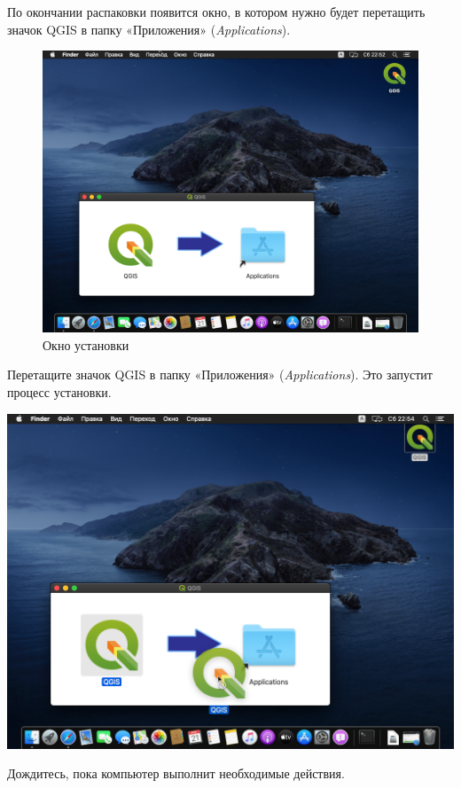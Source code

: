 \documentclass[
  12pt,
]{book}
\begin{document}
По окончании распаковки появится окно, в котором нужно будет перетащить значок QGIS в папку «Приложения» (\emph{Applications}).

\begin{figure}
\centering
\includegraphics{images/installation_instruction_mac/mac04.png}
\caption{Окно установки}
\end{figure}

Перетащите значок QGIS в папку «Приложения» (\emph{Applications}). Это запустит процесс установки.

\includegraphics{images/installation_instruction_mac/mac05.png}

Дождитесь, пока компьютер выполнит необходимые действия.
\end{document}
